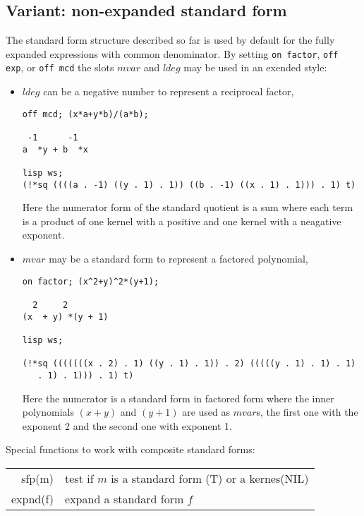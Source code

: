 \subsection{Variant: non-expanded standard form}

The standard form structure described so far is used by default
for the fully expanded expressions with common denominator.
By setting  {\tt on factor}, 
{\tt off exp}, or {\tt off mcd}
the slots $mvar$ and $ldeg$ may be used in an exended style:
\begin{itemize}
\item $ldeg$ can be a negative number to represent a reciprocal factor, 
    
\begin{verbatim}
off mcd; (x*a+y*b)/(a*b);

 -1      -1
a  *y + b  *x

lisp ws;
(!*sq ((((a . -1) ((y . 1) . 1)) ((b . -1) ((x . 1) . 1))) . 1) t)
\end{verbatim}
    Here the numerator form of the standard quotient is a sum where each
    term is a product of one kernel with a positive and one kernel with
    a neagative exponent.

\item $mvar$ may be a standard form to represent a factored polynomial,
\begin{verbatim}
on factor; (x^2+y)^2*(y+1);

  2     2
(x  + y) *(y + 1)

lisp ws;

(!*sq (((((((x . 2) . 1) ((y . 1) . 1)) . 2) (((((y . 1) . 1) . 1)
   . 1) . 1))) . 1) t)
\end{verbatim}
    Here the numerator is a standard form in factored form where the inner polynomials
    $(x+y)$ and $(y+1)$ are used as $mvar$s, the first one with the exponent 2
    and the second one with exponent 1. 
\end{itemize}

Special functions to work with composite standard forms:
\begin{center}
\begin{tabular}{|r|l|} \hline
    sfp(m)    & test if $m$ is a standard form (T) or a kernes(NIL) \\
    expnd(f)  & expand a standard form $f$ \\
\hline
\end{tabular}
\end{center}

